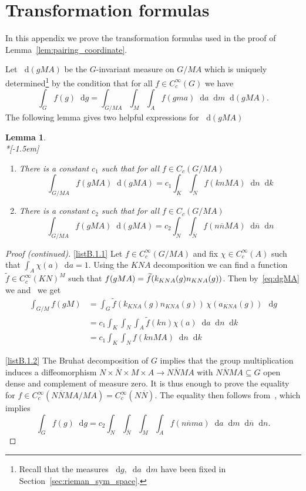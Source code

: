\documentclass[10pt]{amsart}
\newtheorem{lemm}[cdrthm]{Lemma}
\theoremstyle{definition}
\newenvironment{proofc}{\begin{proof}[Proof (continued)]}{\end{proof}}
\newcommand{\til}{\widetilde}
\newcommand{\intd}{\mathop{}\!\mathrm{d}}
\newcommand{\bn}{{\overline{n}}}
\newcommand{\bN}{{\overline{N}}}
\newcommand*{\romanenumi}{\renewcommand*{\theenumi}{\roman{enumi}}}
\begin{document}
\section{Transformation formulas}

In this appendix we prove the transformation formulas used in the proof of Lemma~\ref{lem:pairing_coordinate}.

Let $\intd(gMA)$ be the $G$-invariant measure on $G/MA$ which is uniquely determined\footnote{Recall that the measures $\intd g,\intd a\intd m$ have been fixed in Section~\ref{sec:rieman_sym_space}.} by the condition that for all $f\in C_c^\infty(G)$ we have
\begin{equation}\label{eq:dgMA}
\int_G f(g)\intd g =\int_{G/MA} \int_M \int_A f(gma)\intd a\intd m\intd(gMA).
\end{equation}
The following lemma gives two helpful expressions for $\intd (gMA)$

\begin{lemm}\label{lem:dgMA}\ \\*[-1.5em]
\begin{enumerate}\romanenumi
\item \label{listB.1.1}There is a constant $c_1$ such that for all $f\in C_c(G/MA)$
\[
\int_{G/MA} f(gMA) \intd(gMA) = c_1 \int_K\int_{N} f(knMA) \intd n\intd k
\]
\item \label{listB.1.2}There is a constant $c_2$ such that for all $f\in C_c(G/MA)$
\[
\int_{G/MA} f(gMA) \intd(gMA) = c_2 \int_N \int_{\bN} f(n\bn MA) \intd \bn\intd n
\]
\end{enumerate}
\end{lemm}


\begin{proofc}

\eqref{listB.1.1} Let $f\in C_c^\infty(G/MA)$ and fix $\chi\in C_c^\infty(A)$ such that $\int_A\chi(a)\intd a =1$. Using the $KNA$ decomposition we can find a function $\til f\in C_c^\infty(KN)^M$ such that $f(gMA)\linebreak = \til f(k_{KNA}(g)n_{KNA}(g))$. Then by~\eqref{eq:dgMA} we and~\cite[Corollary~I.5.3]{Hel84} we get
\begin{align*}
\int_{G/M} f(gM) &= \int_G \til f(k_{KNA}(g)n_{KNA}(g))\,\chi(a_{KNA}(g))\,\intd g\\
&=c_1\int_K\int_N\int_A \til f(kn)\chi(a)\intd a\intd n \intd k\\
&=c_1\int_K\int_N f(knMA)\intd n\intd k
\end{align*}

\eqref{listB.1.2} The Bruhat decomposition of $G$ implies that the group multiplication induces a diffeomorphism $N\times \overline N\times M\times A\to N\overline NMA$ with $N\overline NMA\subseteq G$ open dense and complement of measure zero. It is thus enough to prove the equality for $f\in C_c^\infty(N\bN MA/MA)=C_c^\infty(N\bN)$. The equality then follows from~\cite[Proposition~I.5.21]{Hel84}, which implies
\begin{equation}\label{eq:Bruhat-integral}
\int_G f(g)\intd g =c_2 \int_{N}\int_{\overline N}\int_M\int_A f(n\overline nma)\intd a\intd m\intd\overline n\intd n.
\end{equation}
\end{proofc}
\end{document}

